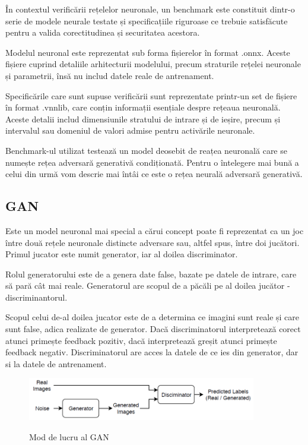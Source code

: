 \hspace{0.5 cm} În contextul verificării rețelelor neuronale, un benchmark este constituit dintr-o serie de modele neurale testate și specificațiile riguroase ce trebuie satisfăcute pentru a valida corectitudinea și securitatea acestora. 

Modelul neuronal este reprezentat sub forma fișierelor în format .onnx. Aceste fișiere cuprind detaliile arhitecturii modelului, precum straturile rețelei neuronale și parametrii, însă nu includ datele reale de antrenament.

Specificările care sunt supuse verificării sunt reprezentate printr-un set de fișiere în format .vnnlib, care conțin informații esențiale despre rețeaua neuronală. Aceste detalii includ dimensiunile stratului de intrare și de ieșire, precum și intervalul sau domeniul de valori admise pentru activările neuronale.

Benchmark-ul utilizat testează un model deosebit de reațea neuronală care se numește rețea adversară generativă condiționată. Pentru o întelegere mai bună a celui din urmă vom descrie mai întâi ce este o rețea neurală adversară generativă.

\subsection*{GAN}
 \hspace{0.5 cm} Este un model neuronal mai special \cite{GAN} a cărui concept poate fi reprezentat ca un joc între două rețele neuronale distincte adversare sau, altfel spus, între doi jucători. Primul jucator este numit generator, iar al doilea discriminator. 
 
 Rolul generatorului este de a genera date false, bazate pe datele de intrare, care să pară cât mai reale. Generatorul are scopul de a păcăli pe al doilea jucător - discriminantorul. 
 
 Scopul celui de-al doilea jucator este de a determina ce imagini sunt reale și care sunt false, adica realizate de generator. Dacă discriminatorul interpretează corect atunci primește feedback pozitiv, dacă interpretează greșit atunci primește feedback negativ. Discriminatorul are  acces la datele de ce ies din generator, dar si la datele de antrenament.

\begin{figure}[ht]
\centering
{\includegraphics[width=10cm]{imagini/GANarch.png}}
\caption{Mod de lucru al GAN}
\label{modDeLucruGAN}
\end{figure}


